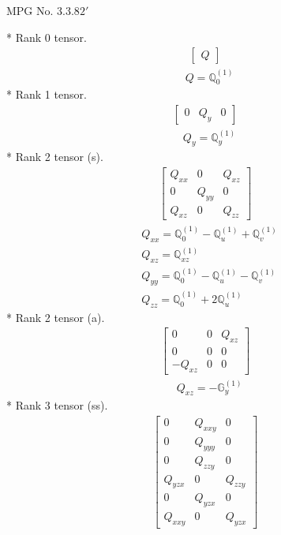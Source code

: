\documentclass[fleqn,8pt,landscape]{jsarticle}
\begin{document}
\setcounter{MaxMatrixCols}{32}

\renewcommand{\tablename}{Table~}
\renewcommand{\figurename}{Figure~}
\begin{center}
\LARGE
MPG No. 3.3.8\quad$2'$
\end{center}
* Rank 0 tensor.
\begin{align*}
\begin{bmatrix} Q \end{bmatrix}
\end{align*}
\begin{align*}
& Q = \mathbb{Q}_{0}^{(1)}
\end{align*}
* Rank 1 tensor.
\begin{align*}
\begin{bmatrix} 0 & Q_{y} & 0 \end{bmatrix}
\end{align*}
\begin{align*}
& Q_{y} = \mathbb{Q}_{y}^{(1)}
\end{align*}
* Rank 2 tensor (s).
\begin{align*}
\begin{bmatrix} Q_{xx} & 0 & Q_{xz} \\ 0 & Q_{yy} & 0 \\ Q_{xz} & 0 & Q_{zz} \end{bmatrix}
\end{align*}
\begin{align*}
& Q_{xx} = \mathbb{Q}_{0}^{(1)} - \mathbb{Q}_{u}^{(1)} + \mathbb{Q}_{v}^{(1)} \\
& Q_{xz} = \mathbb{Q}_{xz}^{(1)} \\
& Q_{yy} = \mathbb{Q}_{0}^{(1)} - \mathbb{Q}_{u}^{(1)} - \mathbb{Q}_{v}^{(1)} \\
& Q_{zz} = \mathbb{Q}_{0}^{(1)} + 2 \mathbb{Q}_{u}^{(1)}
\end{align*}
* Rank 2 tensor (a).
\begin{align*}
\begin{bmatrix} 0 & 0 & Q_{xz} \\ 0 & 0 & 0 \\ - Q_{xz} & 0 & 0 \end{bmatrix}
\end{align*}
\begin{align*}
& Q_{xz} = - \mathbb{G}_{y}^{(1)}
\end{align*}
* Rank 3 tensor (ss).
\begin{align*}
\begin{bmatrix} 0 & Q_{xxy} & 0 \\ 0 & Q_{yyy} & 0 \\ 0 & Q_{zzy} & 0 \\ Q_{yzx} & 0 & Q_{zzy} \\ 0 & Q_{yzx} & 0 \\ Q_{xxy} & 0 & Q_{yzx} \end{bmatrix}
\end{align*}
\end{document}
